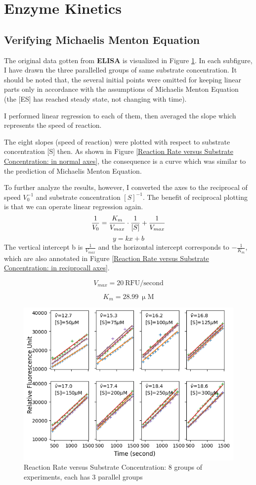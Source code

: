 \documentclass{report}
\begin{document}
\section{Enzyme Kinetics}
\subsection{Verifying Michaelis Menton Equation}
The original data gotten from \textbf{ELISA} is visualized in Figure \ref{Reaction Rate versus Substrate Concentration: 8 groups of experiments}.
In each subfigure, I have drawn the three parallelled groups of same substrate concentration.
It should be noted that, the several initial points were omitted for keeping linear parts only in accordance with the assumptions of Michaelis Menton Equation (the [ES] has reached steady state, not changing with time).

I performed linear regression to each of them, then averaged the slope which represents the speed of reaction.

The eight slopes (speed of reaction) were plotted with respect to substrate concentration [S] then.
As shown in Figure \ref{Reaction Rate versus Substrate Concentration: in normal axes}, the consequence is a curve which was similar to the prediction of Michaelis Menton Equation.

To further analyze the results, however, I converted the axes to the reciprocal of speed $V_0^{-1}$ and substrate concentration $[S]^{-1}$.
The benefit of reciprocal plotting is that we can operate linear regression again.
$$
\frac{1}{V_0}=\frac{K_m}{V_{max}}\cdot \frac{1}{[S]}+\frac{1}{V_{max}}\\
$$
$$
y=kx+b
$$
The vertical intercept b is $\frac{1}{V_{max}}$ and the horizontal intercept corresponds to $-\frac{1}{K_m}$, which are also annotated in Figure \ref{Reaction Rate versus Substrate Concentration: in reciprocall axes}.

$$
V_{max}=20 \ \text{RFU/second}
$$

$$
K_{m}=28.99 \ \upmu \text{M}
$$


\begin{figure}
    \centering
    \includegraphics[width=0.5\linewidth]{../Figures/substrate1.png}
    \caption{Reaction Rate versus Substrate Concentration: 8 groups of experiments, each has 3 parallel groups}
    \label{Reaction Rate versus Substrate Concentration: 8 groups of experiments}
\end{figure}
\end{document}
